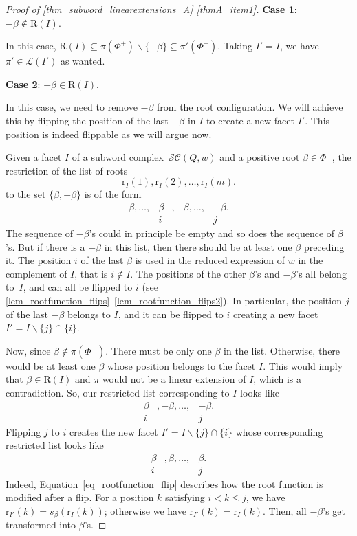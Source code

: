 \documentclass{amsart}
\theoremstyle{definition}
\newcommand{\linearExtensions}{\mathcal{L}} %
\newcommand{\subwordComplex}{\mathcal{SC}} %
\newcommand{\Roots}{\mathrm{R}} %
\newcommand{\rootFunction}[2]{\mathrm{r}_{#1}(#2)} %
\begin{document}
\begin{proof}[Proof of \cref{thm_subword_linearextensions_A} \eqref{thmA_item1}]
\medskip
{\bf Case 1}: $-\beta \notin \Roots(I)$.

In this case, 
$\Roots(I)\subseteq \pi(\Phi^+) \smallsetminus \{-\beta\} \subseteq \pi'(\Phi^+)$.
Taking $I'=I$, we have 
$\pi'\in \linearExtensions(I')$ 
as wanted.

\medskip
{\bf Case 2}: $-\beta \in \Roots(I)$.

In this case, we need to remove $-\beta$ from the root configuration.
We will achieve this by flipping the position of the last $-\beta$ in $I$ to create a new facet $I'$.
This position is indeed flippable as we will argue now. 

Given a facet $I$ of a subword complex~$\subwordComplex(Q,w)$ and a positive root $\beta\in \Phi^+$, the restriction of the list of roots 
\[
\rootFunction{I}{1}, \rootFunction{I}{2}, \dots , \rootFunction{I}{m}.
\]
to the set $\{\beta,-\beta\}$ is of the form
\[
\begin{array}{cccc}
  \beta, \dots , & \beta &, -\beta, \dots, &-\beta.\\
     & i && j
\end{array}
\]
The sequence of $-\beta$'s could in principle be empty and so does the sequence of $\beta$'s.
But if there is a $-\beta$ in this list, then there should be at least one $\beta$ preceding it.
The position $i$ of the last $\beta$ is used in the reduced expression of $w$ in the complement of $I$, that is $i\notin I$.
The positions of the other $\beta$'s and $-\beta$'s all belong to~$I$, and can all be flipped to $i$ (see \cref{lem_rootfunction_flips}~\eqref{lem_rootfunction_flips2}).   
In particular, the position $j$ of the last $-\beta$ belongs to $I$, and it can be flipped to $i$ creating a new facet $I'=I\smallsetminus \{j\} \cap \{i\}$.

Now, since $\beta\notin \pi(\Phi^+)$.
There must be only one $\beta$ in the list.
Otherwise, there would be at least one $\beta$ whose position belongs to the facet $I$.
This would imply that $\beta\in \Roots(I)$ and $\pi$ would not be a linear extension of $I$, which is a contradiction.
So, our restricted list corresponding to $I$ looks like
\begin{equation}
\begin{array}{ccc}
  \beta &, -\beta, \dots, &-\beta.\\
      i && j
\end{array}    
\end{equation}
Flipping $j$ to $i$ creates the new facet $I'=I\smallsetminus \{j\} \cap \{i\}$ whose corresponding restricted list looks like
\begin{equation}
\begin{array}{ccc}
  \beta &, \beta, \dots, &\beta.\\
      i && j
\end{array}    
\end{equation}
Indeed, Equation~\eqref{eq_rootfunction_flip} describes how the root function is modified after a flip.
For a position $k$ satisfying $i<k\leq j$, we have $\rootFunction{I'}{k}=s_\beta (\rootFunction{I}{k})$; otherwise we have $\rootFunction{I'}{k}=\rootFunction{I}{k}$.
Then, all $-\beta$'s get transformed into $\beta$'s.


\end{proof}
\end{document}
